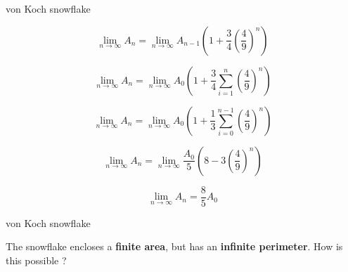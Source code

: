 \documentclass[usenames, dvipsnames, aspectratio=169]{beamer}
\begin{document}
\begin{frame}[t, c]{von Koch snowflake}{}
  \vfill
  \large

  \begin{minipage}{.28\textwidth}
    \centering
  \end{minipage}%
  \hfill
  \begin{minipage}{.68\textwidth}
    \begin{overprint}
      \[
      \lim_{n \to \infty} A_n = \lim_{n \to \infty} A_{n-1} \left( 1 + \dfrac{3}{4} \left( \dfrac{4}{9} \right)^n \right)
      \]

      \[
      \lim_{n \to \infty} A_n = \lim_{n \to \infty} A_0 \left( 1 + \dfrac{3}{4} \sum_{i=1}^n \left( \dfrac{4}{9} \right)^n \right)
      \]

      \[
      \lim_{n \to \infty} A_n = \lim_{n \to \infty} A_0 \left( 1 + \dfrac{1}{3} \sum_{i=0}^{n-1} \left( \dfrac{4}{9} \right)^n \right)
      \]


      \[
      \lim_{n \to \infty} A_n = \lim_{n \to \infty} \dfrac{A_0}{5} \left( 8 - 3 \left( \dfrac{4}{9} \right)^n \right)
      \]

      \[
      \lim_{n \to \infty} A_n = \dfrac{8}{5} A_0
      \]
    \end{overprint}
  \end{minipage}

  \vfill

\end{frame}


\begin{frame}[t, c]{von Koch snowflake}{}
  \vfill
  \large

  \begin{minipage}{.28\textwidth}
    \centering
  \end{minipage}%
  \hfill
  \begin{minipage}{.68\textwidth}
    The snowflake encloses a \textbf{finite area}, but has an \textbf{infinite perimeter}.
    How is this possible ?
  \end{minipage}

  \vfill

\end{frame}
\end{document}

